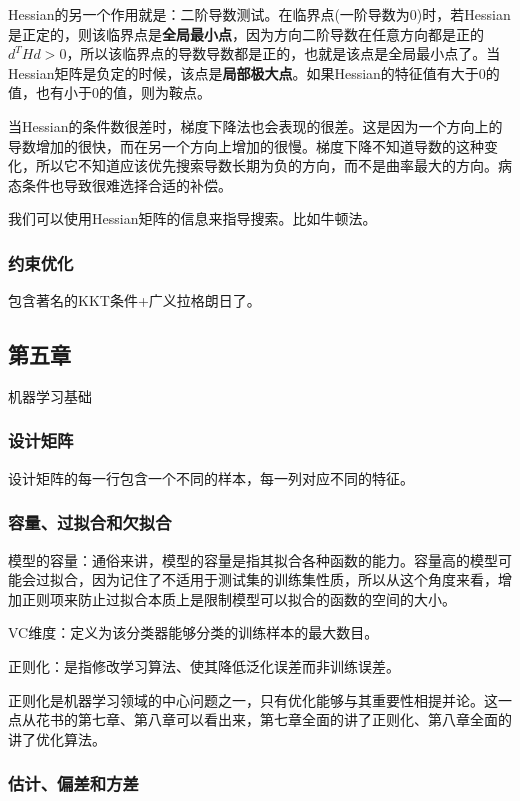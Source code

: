 Hessian的另一个作用就是：二阶导数测试。在临界点(一阶导数为0)时，若Hessian是正定的，则该临界点是\textbf{全局最小点}，因为方向二阶导数在任意方向都是正的$d^THd > 0$，所以该临界点的导数导数都是正的，也就是该点是全局最小点了。当Hessian矩阵是负定的时候，该点是\textbf{局部极大点}。如果Hessian的特征值有大于0的值，也有小于0的值，则为鞍点。

当Hessian的条件数很差时，梯度下降法也会表现的很差。这是因为一个方向上的导数增加的很快，而在另一个方向上增加的很慢。梯度下降不知道导数的这种变化，所以它不知道应该优先搜索导数长期为负的方向，而不是曲率最大的方向。病态条件也导致很难选择合适的补偿。

我们可以使用Hessian矩阵的信息来指导搜索。比如牛顿法。

\subsubsection{约束优化}

包含著名的KKT条件+广义拉格朗日了。


\subsection{第五章}

机器学习基础

\subsubsection{设计矩阵}

设计矩阵的每一行包含一个不同的样本，每一列对应不同的特征。

\subsubsection{容量、过拟合和欠拟合}

模型的容量：通俗来讲，模型的容量是指其拟合各种函数的能力。容量高的模型可能会过拟合，因为记住了不适用于测试集的训练集性质，所以从这个角度来看，增加正则项来防止过拟合本质上是限制模型可以拟合的函数的空间的大小。

VC维度：定义为该分类器能够分类的训练样本的最大数目。

正则化：是指修改学习算法、使其降低泛化误差而非训练误差。

正则化是机器学习领域的中心问题之一，只有优化能够与其重要性相提并论。这一点从花书的第七章、第八章可以看出来，第七章全面的讲了正则化、第八章全面的讲了优化算法。

\subsubsection{估计、偏差和方差}


